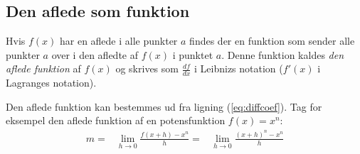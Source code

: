 \documentclass[a4paper, 12pt]{article}
\begin{document}
\subsection{Den aflede som funktion}
Hvis $f(x)$ har en aflede i alle punkter $a$ findes der en funktion som sender alle punkter $a$ over i den afledte af $f(x)$ i punktet $a$. Denne funktion kaldes \emph{den aflede funktion} af $f(x)$ og skrives som $\frac{df}{dx}$ i Leibnizs notation ($f'(x)$ i Lagranges notation).

Den aflede funktion kan bestemmes ud fra ligning (\ref{eq:diffcoef}). Tag for eksempel den aflede funktion af en potensfunktion $f(x) = x^n$:
\begin{align}
m =& \lim_{h\to0}\frac{f(x+h) - x^n}{h}
 =& \lim_{h\to0}\frac{(x+h)^n - x^n}{h}
\end{align}
\end{document}
